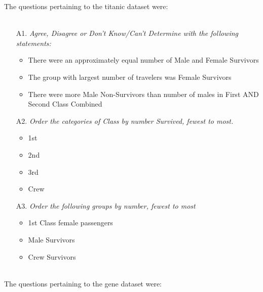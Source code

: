 \noindent The questions pertaining to the titanic dataset were: \\ \\
\begin{itemize}
\item[A1.]\emph{Agree, Disagree or Don't Know/Can't Determine with the following statements:}
\begin{itemize}
\item There were an approximately equal number of Male and Female Survivors
\item The group with largest number of travelers was Female Survivors
\item There were more Male Non-Survivors than number of males in First AND Second Class Combined
\end{itemize}

\item[A2.]\emph{Order the categories of Class by number Survived, fewest to most.} 
\begin{itemize}
\item 1st
\item 2nd 
\item 3rd
\item Crew
\end{itemize}

\item[A3.]\emph{Order the following groups by number, fewest to most}
\begin{itemize}
\item 1st Class female passengers
\item Male Survivors
\item Crew Survivors
\end{itemize}
\end{itemize}


\noindent \\  The questions pertaining to the gene dataset were: 


